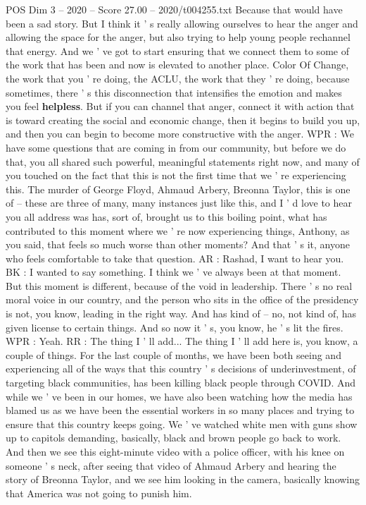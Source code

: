 \begin{textsample}{POS Dim 3 – 2020 – Score 27.00 – 2020/t004255.txt}
Because that would have been a sad story.
But I think it ' s really allowing ourselves to hear the anger and allowing the space for the anger, but also trying to help young people rechannel that energy.
And we ' ve got to start ensuring that we connect them to some of the work that has been and now is elevated to another place.
Color Of Change, the work that you ' re doing, the ACLU, the work that they ' re doing, because sometimes, there ' s this disconnection that intensifies the emotion and makes you feel \textbf{helpless}.
But if you can channel that anger, connect it with action that is toward creating the social and economic change, then it begins to build you up, and then you can begin to become more constructive with the anger.
WPR : We have some questions that are coming in from our community, but before we do that, you all shared such powerful, meaningful statements right now, and many of you touched on the fact that this is not the first time that we ' re experiencing this.
The murder of George Floyd, Ahmaud Arbery, Breonna Taylor, this is one of -- these are three of many, many instances just like this, and I ' d love to hear you all address was has, sort of, brought us to this boiling point, what has contributed to this moment where we ' re now experiencing things, Anthony, as you said, that feels so much worse than other moments?
And that ' s it, anyone who feels comfortable to take that question.
AR : Rashad, I want to hear you.
BK : I wanted to say something.
I think we ' ve always been at that moment.
But this moment is different, because of the void in leadership.
There ' s no real moral voice in our country, and the person who sits in the office of the presidency is not, you know, leading in the right way.
And has kind of -- no, not kind of, has given license to certain things.
And so now it ' s, you know, he ' s lit the fires.
WPR : Yeah.
RR : The thing I ' ll add...
The thing I ' ll add here is, you know, a couple of things.
For the last couple of months, we have been both seeing and experiencing all of the ways that this country ' s decisions of underinvestment, of targeting black communities, has been killing black people through COVID.
And while we ' ve been in our homes, we have also been watching how the media has blamed us as we have been the essential workers in so many places and trying to ensure that this country keeps going.
We ' ve watched white men with guns show up to capitols demanding, basically, black and brown people go back to work.
And then we see this eight-minute video with a police officer, with his knee on someone ' s neck, after seeing that video of Ahmaud Arbery and hearing the story of Breonna Taylor, and we see him looking in the camera, basically knowing that America was not going to punish him.

\end{textsample}

